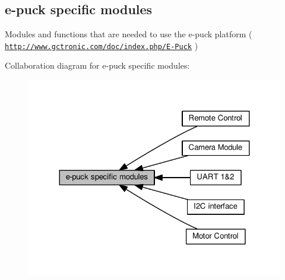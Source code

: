 \hypertarget{group__epuck}{}\subsection{e-\/puck specific modules}
\label{group__epuck}


Modules and functions that are needed to use the e-\/puck platform ( \href{http://www.gctronic.com/doc/index.php/E-Puck}{\tt http\+://www.\+gctronic.\+com/doc/index.\+php/\+E-\/\+Puck} )  


Collaboration diagram for e-\/puck specific modules\+:\nopagebreak
\begin{figure}[H]
\begin{center}
\leavevmode
\includegraphics[width=324pt]{d9/dc8/group__epuck}
\end{center}
\end{figure}
